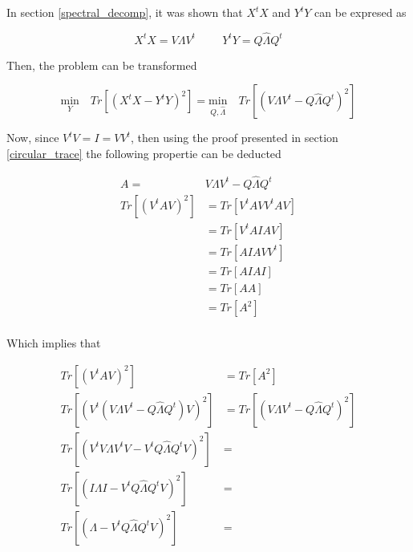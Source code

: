 \documentclass[12pt,journal]{IEEEtran}
\begin{document}
    In section \ref{spectral_decomp}, it was shown that $X^tX$ and $Y^tY$ can be
    expresed as

    \begin{equation*}
        X^tX = V\Lambda V^t \hspace{1cm} Y^tY = Q \hat{\Lambda} Q^t
    \end{equation*}

    Then, the problem can be transformed

    \begin{equation*}
        \underset{Y}{\text{min}} \quad Tr[(X^tX - Y^tY)^2]
        =
        \underset{Q,\hat{\Lambda}}{\text{min}} \quad Tr[(V\Lambda V^t - Q \hat{\Lambda} Q^t)^2]
    \end{equation*}

    Now, since $V^tV = I = VV^t$, then using the proof presented in section
    \ref{circular_trace} the following propertie can be deducted

    \begin{equation*}
        \begin{aligned}
            A =& V\Lambda V^t - Q \hat{\Lambda} Q^t\\
            Tr[(V^tAV)^2] &= Tr[V^tAVV^tAV]\\
                          &= Tr[V^tAIAV]\\
                          &= Tr[AIAVV^t]\\
                          &= Tr[AIAI]\\
                          &= Tr[AA]\\
                          &= Tr[A^2]\\
        \end{aligned}
    \end{equation*}

    Which implies that

    \begin{equation*}
        \begin{aligned}
            Tr[(V^tAV)^2] &= Tr[A^2]\\
            Tr[(V^t(V\Lambda V^t - Q \hat{\Lambda} Q^t)V)^2] &= Tr[(V\Lambda V^t - Q \hat{\Lambda} Q^t)^2]\\
            Tr[(V^tV\Lambda V^tV - V^tQ \hat{\Lambda} Q^tV)^2] &=\\
            Tr[(I\Lambda I - V^tQ \hat{\Lambda} Q^tV)^2] &=\\
            Tr[(\Lambda - V^tQ \hat{\Lambda} Q^tV)^2] &=\\
        \end{aligned}
    \end{equation*}
\end{document}
